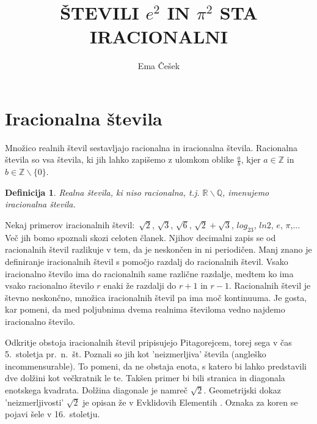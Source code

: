 \documentclass[a4paper]{article}
\theoremstyle{plain}
\newtheorem{definicija}{Definicija}
\begin{document}
\title{\textbf{ŠTEVILI $e^2$ IN $\pi^2$ STA IRACIONALNI}}
\author{Ema Češek}
\date{}
\maketitle

\section*{Iracionalna števila}
Množico realnih števil sestavljajo racionalna in iracionalna števila. Racionalna števila so vsa števila, ki jih lahko zapišemo z ulomkom oblike $\frac{a}{b}$, kjer $a\in \mathbb{Z}$ in $b\in \mathbb{Z}\backslash\{0\}$.
\begin{definicija}
Realna števila, ki niso racionalna, t.j. $\mathbb{R}\backslash\mathbb{Q}$, imenujemo iracionalna števila.
\end{definicija}
Nekaj primerov iracionalnih števil:\ $\sqrt{2}$, $\sqrt{3}$, $\sqrt{6}$, $\sqrt{2}+\sqrt{3}$,  $log_23$, $ln2$, $e$, $\pi$,... Več jih bomo spoznali skozi celoten članek. Njihov decimalni zapis se od racionalnih števil razlikuje v tem, da je neskončen in ni periodičen. Manj znano je definiranje iracionalnih števil s pomočjo razdalj do racionalnih števil. Vsako iracionalno število ima do racionalnih same različne razdalje, medtem ko ima vsako racionalno število $r$ enaki že razdalji do $r+1$ in $r-1$. Racionalnih števil je števno neskončno, množica iracionalnih števil pa ima moč kontinuuma. Je gosta, kar pomeni, da med poljubnima dvema realnima številoma vedno najdemo iracionalno število.


Odkritje obstoja iracionalnih števil pripisujejo Pitagorejcem, torej sega v čas 5.\ stoletja pr.\ n.\ št. Poznali so jih kot 'neizmerljiva' števila (angleško incommensurable). To pomeni, da ne obstaja enota, s katero bi lahko predstavili dve dolžini kot večkratnik le te. Takšen primer bi bili stranica in diagonala enotskega kvadrata. Dolžina diagonale je namreč $\sqrt{2}$. Geometrijski dokaz 'neizmerljivosti' $\sqrt{2}$ je opisan že v Evklidovih Elementih \cite{knjiznica}. Oznaka za koren se pojavi šele v 16.\ stoletju. 
\end{document}
